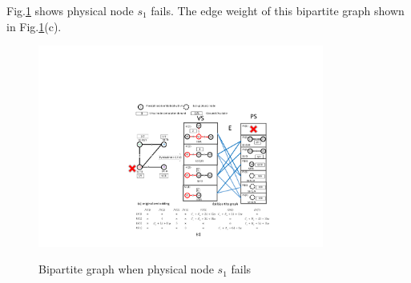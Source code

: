 Fig.\ref{fig:StarRepresentation} shows  physical node $s_1$ fails. The edge weight of this   bipartite graph  shown in Fig.\ref{fig:StarRepresentation}(c).
\begin{figure}
\centering
\includegraphics[width=3.7in]{Fig/StarRepresentation}\\
  \caption{Bipartite graph when physical node $s_1$ fails}\label{fig:StarRepresentation}
\end{figure}



